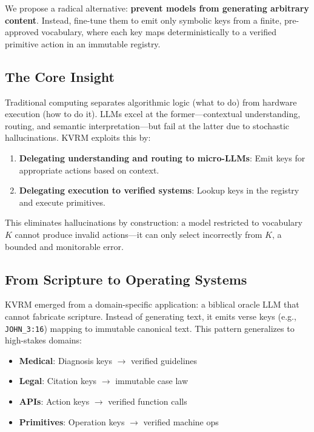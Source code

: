 \documentclass[11pt,a4paper]{article}
\begin{document}
We propose a radical alternative: \textbf{prevent models from generating arbitrary content}. Instead, fine-tune them to emit only symbolic keys from a finite, pre-approved vocabulary, where each key maps deterministically to a verified primitive action in an immutable registry.

\subsection{The Core Insight}

Traditional computing separates algorithmic logic (what to do) from hardware execution (how to do it). LLMs excel at the former---contextual understanding, routing, and semantic interpretation---but fail at the latter due to stochastic hallucinations. KVRM exploits this by:

\begin{enumerate}
    \item \textbf{Delegating understanding and routing to micro-LLMs}: Emit keys for appropriate actions based on context.
    \item \textbf{Delegating execution to verified systems}: Lookup keys in the registry and execute primitives.
\end{enumerate}

This eliminates hallucinations by construction: a model restricted to vocabulary $K$ cannot produce invalid actions---it can only select incorrectly from $K$, a bounded and monitorable error.

\subsection{From Scripture to Operating Systems}

KVRM emerged from a domain-specific application: a biblical oracle LLM that cannot fabricate scripture. Instead of generating text, it emits verse keys (e.g., \texttt{JOHN\_3:16}) mapping to immutable canonical text. This pattern generalizes to high-stakes domains:

\begin{itemize}
    \item \textbf{Medical}: Diagnosis keys $\to$ verified guidelines
    \item \textbf{Legal}: Citation keys $\to$ immutable case law
    \item \textbf{APIs}: Action keys $\to$ verified function calls
    \item \textbf{Primitives}: Operation keys $\to$ verified machine ops
\end{itemize}
\end{document}
